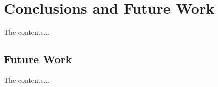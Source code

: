 %
%

\chapter{Conclusions and Future Work}
\label{chap:conclusions_and_future_work}

The contents...

%
%

\section{Future Work}
The contents...
